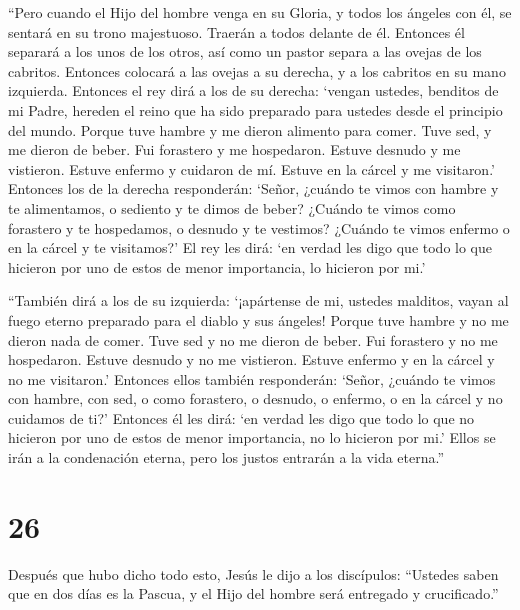  ``Pero cuando el Hijo del hombre venga en su Gloria, y
todos los ángeles con él, se sentará en su trono majestuoso.
 Traerán a todos delante de él. Entonces él separará a los
unos de los otros, así como un pastor separa a las ovejas de los
cabritos.  Entonces colocará a las ovejas a su derecha, y a
los cabritos en su mano izquierda.  Entonces el rey dirá a
los de su derecha: `vengan ustedes, benditos de mi Padre, hereden el
reino que ha sido preparado para ustedes desde el principio del mundo.
 Porque tuve hambre y me dieron alimento para comer. Tuve
sed, y me dieron de beber. Fui forastero y me hospedaron. 
Estuve desnudo y me vistieron. Estuve enfermo y cuidaron de mí. Estuve
en la cárcel y me visitaron.'  Entonces los de la derecha
responderán: `Señor, ¿cuándo te vimos con hambre y te alimentamos, o
sediento y te dimos de beber?  ¿Cuándo te vimos como
forastero y te hospedamos, o desnudo y te vestimos? 
¿Cuándo te vimos enfermo o en la cárcel y te visitamos?' 
El rey les dirá: `en verdad les digo que todo lo que hicieron por uno de
estos de menor importancia, lo hicieron por mi.'

 ``También dirá a los de su izquierda: `¡apártense de mi,
ustedes malditos, vayan al fuego eterno preparado para el diablo y sus
ángeles!  Porque tuve hambre y no me dieron nada de comer.
Tuve sed y no me dieron de beber.  Fui forastero y no me
hospedaron. Estuve desnudo y no me vistieron. Estuve enfermo y en la
cárcel y no me visitaron.'  Entonces ellos también
responderán: `Señor, ¿cuándo te vimos con hambre, con sed, o como
forastero, o desnudo, o enfermo, o en la cárcel y no cuidamos de ti?'
 Entonces él les dirá: `en verdad les digo que todo lo que
no hicieron por uno de estos de menor importancia, no lo hicieron por
mi.'  Ellos se irán a la condenación eterna, pero los
justos entrarán a la vida eterna.''

\hypertarget{section-25}{%
\section{26}\label{section-25}}

 Después que hubo dicho todo esto, Jesús le dijo a los
discípulos:  ``Ustedes saben que en dos días es la Pascua, y
el Hijo del hombre será entregado y crucificado.''

